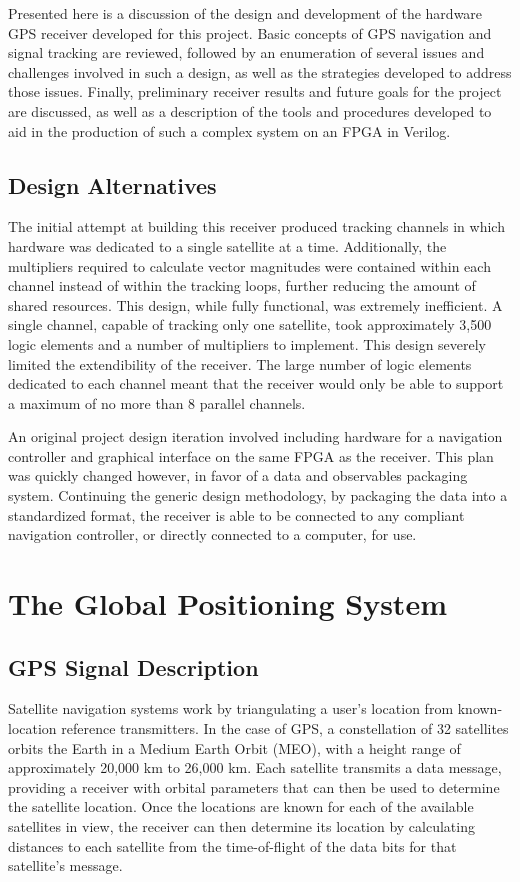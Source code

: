 \documentclass[12pt]{article}
\begin{document}
Presented here is a discussion of the design and development of the hardware GPS receiver developed for this project. Basic concepts of GPS navigation and signal tracking are reviewed, followed by an enumeration of several issues and challenges involved in such a design, as well as the strategies developed to address those issues. Finally, preliminary receiver results and future goals for the project are discussed, as well as a description of the tools and procedures developed to aid in the production of such a complex system on an FPGA in Verilog.

\subsection{Design Alternatives}
The initial attempt at building this receiver produced tracking channels in which hardware was dedicated to a single satellite at a time. Additionally, the multipliers required to calculate vector magnitudes were contained within each channel instead of within the tracking loops, further reducing the amount of shared resources. This design, while fully functional, was extremely inefficient. A single channel, capable of tracking only one satellite, took approximately 3,500 logic elements and a number of multipliers to implement. This design severely limited the extendibility of the receiver. The large number of logic elements dedicated to each channel meant that the receiver would only be able to support a maximum of no more than 8 parallel channels.

An original project design iteration involved including hardware for a navigation controller and graphical interface on the same FPGA as the receiver. This plan was quickly changed however, in favor of a data and observables packaging system. Continuing the generic design methodology, by packaging the data into a standardized format, the receiver is able to be connected to any compliant navigation controller, or directly connected to a computer, for use.

\section{The Global Positioning System}

\subsection{GPS Signal Description}
\label{sec:signal description}
Satellite navigation systems work by triangulating a user's location from known-location reference transmitters. In the case of GPS, a constellation of 32 satellites orbits the Earth in a Medium Earth Orbit (MEO), with a height range of approximately 20,000 km to 26,000 km. \cite{navstar} Each satellite transmits a data message, providing a receiver with orbital parameters that can then be used to determine the satellite location. Once the locations are known for each of the available satellites in view, the receiver can then determine its location by calculating distances to each satellite from the time-of-flight of the data bits for that satellite's message.
\end{document}

